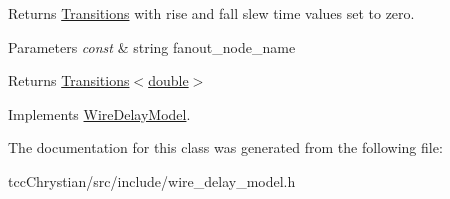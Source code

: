 Returns \hyperlink{classTransitions}{Transitions} with rise and fall slew time values set to zero. 


\begin{DoxyParams}{Parameters}
{\em const} & string fanout\-\_\-node\-\_\-name\\
\hline
\end{DoxyParams}
\begin{DoxyReturn}{Returns}
\hyperlink{classTransitions}{Transitions$<$double$>$} 
\end{DoxyReturn}


Implements \hyperlink{classWireDelayModel_adaf486017e2ad91a900a9bef4e6f9340}{Wire\-Delay\-Model}.



The documentation for this class was generated from the following file\-:\begin{DoxyCompactItemize}
\item 
tcc\-Chrystian/src/include/wire\-\_\-delay\-\_\-model.\-h\end{DoxyCompactItemize}
